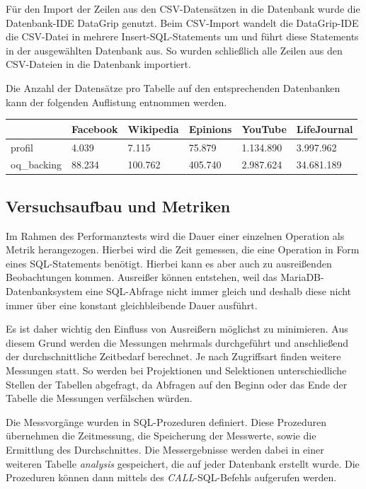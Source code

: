 Für den Import der Zeilen aus den CSV-Datensätzen in die Datenbank wurde die Datenbank-IDE DataGrip genutzt. Beim CSV-Import wandelt die DataGrip-IDE die CSV-Datei in mehrere Insert-SQL-Statements um und führt diese Statements in der ausgewählten Datenbank aus. So wurden schließlich alle Zeilen aus den CSV-Dateien in die Datenbank importiert.

Die Anzahl der Datensätze pro Tabelle auf den entsprechenden Datenbanken kann der folgenden Auflistung entnommen werden.

\begin{center}
	\begin{tabular}{l|l l l l l }
		& Facebook & Wikipedia & Epinions & YouTube & LifeJournal \\
		\hline
		profil & 4.039 & 7.115 & 75.879 & 1.134.890 & 3.997.962 \\
		oq\_backing & 88.234 & 100.762 & 405.740 & 2.987.624 & 34.681.189 \\
	\end{tabular}
\end{center}

\subsection{Versuchsaufbau und Metriken}

Im Rahmen des Performanztests wird die Dauer einer einzelnen Operation als Metrik herangezogen. Hierbei wird die Zeit gemessen, die eine Operation in Form eines SQL-Statements benötigt. Hierbei kann es aber auch zu ausreißenden Beobachtungen kommen. Ausreißer können entstehen, weil das MariaDB-Datenbanksystem eine SQL-Abfrage nicht immer gleich und deshalb diese nicht immer über eine konstant gleichbleibende Dauer ausführt.

Es ist daher wichtig den Einfluss von Ausreißern möglichst zu minimieren. Aus diesem Grund werden die Messungen mehrmals durchgeführt und anschließend der durchschnittliche Zeitbedarf berechnet. Je nach Zugriffsart finden weitere Messungen statt. So werden bei Projektionen und Selektionen unterschiedliche Stellen der Tabellen abgefragt, da Abfragen auf den Beginn oder das Ende der Tabelle die Messungen verfälschen würden.

Die Messvorgänge wurden in SQL-Prozeduren definiert. Diese Prozeduren übernehmen die Zeitmessung, die Speicherung der Messwerte, sowie die Ermittlung des Durchschnittes. Die Messergebnisse werden dabei in einer weiteren Tabelle \emph{analysis} gespeichert, die auf jeder Datenbank erstellt wurde. Die Prozeduren können dann mittels des \emph{CALL}-SQL-Befehls aufgerufen werden.

